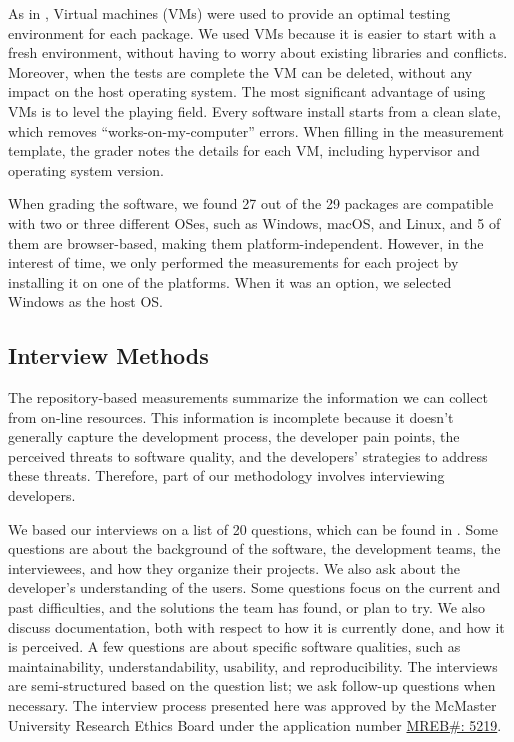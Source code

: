 \documentclass[11pt]{article}
\begin{document}
As in \citet{SmithEtAl2016}, Virtual machines (VMs) were used to provide an
optimal testing environment for each package. We used VMs because it is easier
to start with a fresh environment, without having to worry about existing
libraries and conflicts. Moreover, when the tests are complete the VM can be
deleted, without any impact on the host operating system. The most significant
advantage of using VMs is to level the playing field. Every software install
starts from a clean slate, which removes ``works-on-my-computer'' errors. When
filling in the measurement template, the grader notes the details for each VM,
including hypervisor and operating system version.

When grading the software, we found 27 out of the 29 packages are compatible
with two or three different OSes, such as Windows, macOS, and Linux, and 5 of
them are browser-based, making them platform-independent. However, in the
interest of time, we only performed the measurements for each project by
installing it on one of the platforms.  When it was an option, we selected
Windows as the host OS.

\subsection{Interview Methods} \label{sec_interview_methods}

The repository-based measurements summarize the information we can collect from
on-line resources. This information is incomplete because it doesn't generally
capture the development process, the developer pain points, the perceived
threats to software quality, and the developers' strategies to address these
threats.  Therefore, part of our methodology involves interviewing developers.

We based our interviews on a list of 20 questions, which can be found in
\citet{SmithEtAl2021}. Some questions are about the background of the software,
the development teams, the interviewees, and how they organize their projects.
We also ask about the developer's understanding of the users. Some questions
focus on the current and past difficulties, and the solutions the team has
found, or plan to try. We also discuss documentation, both with respect to how
it is currently done, and how it is perceived. A few questions are about
specific software qualities, such as maintainability, understandability,
usability, and reproducibility. The interviews are semi-structured based on the
question list; we ask follow-up questions when necessary.  The interview process
presented here was approved by the McMaster University Research Ethics Board
under the application number
\href{https://github.com/smiths/AIMSS/blob/master/StateOfPractice/MACREM/Application.pdf}
{MREB\#: 5219}.
\end{document}
